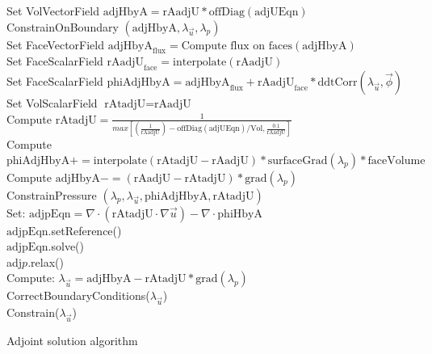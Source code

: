 \documentclass[10pt]{article} %
\begin{document}
\begin{center}
\begin{algorithm}[H]
{{{				Set VolVectorField $\text{adjHbyA} =  \text{rAadjU}*\text{offDiag}(\text{adjUEqn})$\\
				ConstrainOnBoundary $(\text{adjHbyA},\lambda_{\vec{u}},\lambda_p)$\\
				\quad Set FaceVectorField $\text{adjHbyA}_{\text{flux}} =  \text{Compute flux on faces}(\text{adjHbyA})$\\
				\quad Set FaceScalarField $\text{rAadjU}_{\text{face}} =  \text{interpolate}(\text{rAadjU})$\\
				Set FaceScalarField $\text{phiAdjHbyA} = \text{adjHbyA}_{\text{flux}} + \text{rAadjU}_{\text{face}}*\text{ddtCorr}(\lambda_{\vec{u}}, \vec{\phi}) $\\
				Set VolScalarField $\text{rAtadjU} = \text{rAadjU}$\\
				{
					Compute $\text{rAtadjU} =  \frac{1}{max\left[(\frac{1}{\text{rAadjU}}) - \text{offDiag}(\text{adjUEqn})/\text{Vol} , \frac{0.1}{\text{rAadjU}}\right]} $\\
					Compute $\text{phiAdjHbyA} += \text{interpolate}(\text{rAtadjU}-\text{rAadjU})*\text{surfaceGrad}(\lambda_p)*\text{faceVolume}$\\
					Compute $\text{adjHbyA} -=  \left(\text{rAadjU}-\text{rAtadjU}\right)*\text{grad}(\lambda_p)$\\
				}
				ConstrainPressure $(\lambda_p,\lambda_{\vec{u}},\text{phiAdjHbyA},\text{rAtadjU})$\\
				{
					Set: $\text{adjpEqn} = \nabla \cdot \left(\text{rAtadjU} \cdot \nabla \vec{u}\right)-\nabla \cdot \text{phiHbyA}$\\
					$\text{adjpEqn}.$setReference()\\
					$\text{adjpEqn}.$solve()\\
				}
				adj$p.$relax()\\
				Compute: $\lambda_{\vec{u}} = \text{adjHbyA} - \text{rAtadjU}*\text{grad}(\lambda_p)$\\
				CorrectBoundaryConditions($\lambda_{\vec{u}}$)\\
				Constrain($\lambda_{\vec{u}}$)
			}
		}
	}
	\caption{Adjoint solution algorithm}
\end{algorithm}
\newpage
	

\end{center}
\end{document}
